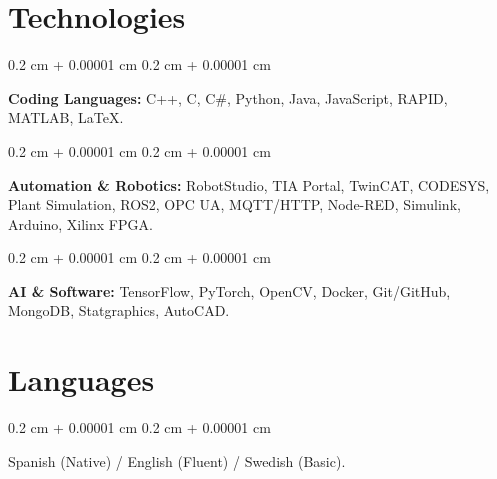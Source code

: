 \documentclass[10pt, letterpaper]{article}
\newenvironment{onecolentry}{
    \begin{adjustwidth}{
        0.2 cm + 0.00001 cm
    }{
        0.2 cm + 0.00001 cm
    }
}{
    \end{adjustwidth}
} %
\begin{document}
        \section{Technologies}

        \begin{onecolentry}
            \textbf{Coding Languages:} C++, C, C\#, Python, Java, JavaScript, RAPID, MATLAB, LaTeX.
        \end{onecolentry}

        \vspace{0.2 cm}

        \begin{onecolentry}
            \textbf{Automation \& Robotics:} RobotStudio, TIA Portal, TwinCAT, CODESYS, Plant Simulation, ROS2, OPC UA, MQTT/HTTP, Node-RED, Simulink, Arduino, Xilinx FPGA.
        \end{onecolentry}

        \vspace{0.2 cm}

        \begin{onecolentry}
            \textbf{AI \& Software:} TensorFlow, PyTorch, OpenCV, Docker, Git/GitHub, MongoDB, Statgraphics, AutoCAD.
        \end{onecolentry}

        \section{Languages}

        \begin{onecolentry}
         Spanish (Native) / English (Fluent) / Swedish (Basic).
        \end{onecolentry}
\end{document}
